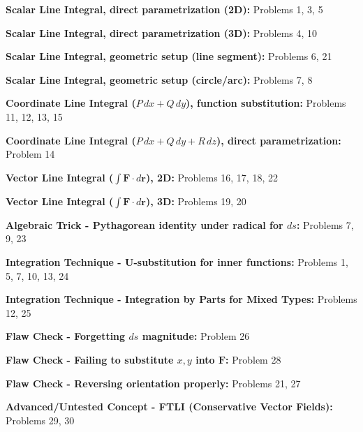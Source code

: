 \documentclass[11pt]{article}
\begin{document}
\begin{enumerate}[label={[C\arabic*]}]
    \item \textbf{Scalar Line Integral, direct parametrization (2D):} Problems 1, 3, 5
    \item \textbf{Scalar Line Integral, direct parametrization (3D):} Problems 4, 10
    \item \textbf{Scalar Line Integral, geometric setup (line segment):} Problems 6, 21
    \item \textbf{Scalar Line Integral, geometric setup (circle/arc):} Problems 7, 8
    \item \textbf{Coordinate Line Integral ($P\,dx + Q\,dy$), function substitution:} Problems 11, 12, 13, 15
    \item \textbf{Coordinate Line Integral ($P\,dx + Q\,dy + R\,dz$), direct parametrization:} Problem 14
    \item \textbf{Vector Line Integral ($\int \mathbf{F} \cdot d\mathbf{r}$), 2D:} Problems 16, 17, 18, 22
    \item \textbf{Vector Line Integral ($\int \mathbf{F} \cdot d\mathbf{r}$), 3D:} Problems 19, 20
    \item \textbf{Algebraic Trick - Pythagorean identity under radical for $ds$:} Problems 7, 9, 23
    \item \textbf{Integration Technique - U-substitution for inner functions:} Problems 1, 5, 7, 10, 13, 24
    \item \textbf{Integration Technique - Integration by Parts for Mixed Types:} Problems 12, 25
    \item \textbf{Flaw Check - Forgetting $ds$ magnitude:} Problem 26
    \item \textbf{Flaw Check - Failing to substitute $x,y$ into $\mathbf{F}$:} Problem 28
    \item \textbf{Flaw Check - Reversing orientation properly:} Problems 21, 27
    \item \textbf{Advanced/Untested Concept - FTLI (Conservative Vector Fields):} Problems 29, 30
\end{enumerate}
\end{document}
